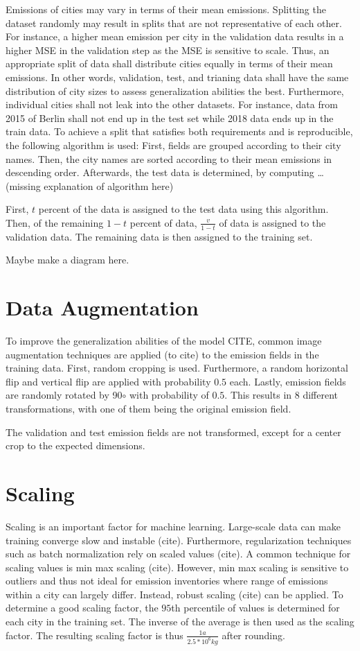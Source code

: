 Emissions of cities may vary in terms of their mean emissions.
Splitting the dataset randomly may result in splits that are not representative of each other.
For instance, a higher mean emission per city in the validation data results in a higher MSE in the validation step as the MSE is sensitive to scale.
Thus, an appropriate split of data shall distribute cities equally in terms of their mean emissions.
In other words, validation, test, and trianing data shall have the same distribution of city sizes to assess generalization abilities the best. 
Furthermore, individual cities shall not leak into the other datasets.
For instance, data from 2015 of Berlin shall not end up in the test set while 2018 data ends up in the train data.
To achieve a split that satisfies both requirements and is reproducible, the following algorithm is used:
First, fields are grouped according to their city names.
Then, the city names are sorted according to their mean emissions in descending order.
Afterwards, the test data is determined, by computing \dots (missing explanation of algorithm here)

First, $t$ percent of the data is assigned to the test data using this algorithm.
Then, of the remaining $1 - t$ percent of data, $\frac{v}{1 - t}$ of data is assigned to the validation data.
The remaining data is then assigned to the training set.

Maybe make a diagram here.

\section{Data Augmentation}
To improve the generalization abilities of the model CITE, common image augmentation techniques are applied (to cite) to the emission fields in the training data.
First, random cropping is used.
Furthermore, a random horizontal flip and vertical flip are applied with probability $0.5$ each.
Lastly, emission fields are randomly rotated by 90$\circ$ with probability of $0.5$.
This results in $8$ different transformations, with one of them being the original emission field.

The validation and test emission fields are not transformed, except for a center crop to the expected dimensions.

\section{Scaling}
Scaling is an important factor for machine learning.
Large-scale data can make training converge slow and instable (cite).
Furthermore, regularization techniques such as batch normalization \parencite{BatchNorm} rely on scaled values (cite).
A common technique for scaling values is min max scaling (cite).
However, min max scaling is sensitive to outliers and thus not ideal for emission inventories where range of emissions within a city can largely differ.
Instead, robust scaling (cite) can be applied.
To determine a good scaling factor, the $95$th percentile of values is determined for each city in the training set.
The inverse of the average is then used as the scaling factor.
The resulting scaling factor is thus $\frac{1 a}{2.5 * 10^6 kg}$ after rounding.

